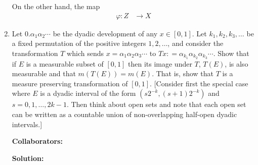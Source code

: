 \documentclass{article}%
\begin{document}
\begin{enumerate}
On the other hand, the map
$$
\begin{aligned}
\varphi: Z &\to X
\end{aligned}
$$
\bigskip


\item  Let $0.\alpha_1 \alpha_2 \cdots$ be the dyadic development of any $x\in[0,1]$. Let $k_1,k_2,k_3,\ldots$ be a fixed permutation of the positive integers $1,2,\ldots$, and consider the transformation $T$ which sends $x = \alpha_1\alpha_2\alpha_3\cdots$ to $Tx: = \alpha_{k_1}\alpha_{k_2}\alpha_{k_3}\cdots$. Show that if $E$ is a measurable subset of $[0,1]$ then its image under $T$, $T(E)$, is also measurable and that $m(T(E))= m(E)$.  That is, show that $T$ is a measure preserving transformation of $[0,1]$. [Consider first the special case where $E$ is a dyadic interval of the form $(s2^{-k}, (s+1)2^{-k})$ and $s = 0,1,\ldots, 2k-1$.  Then think about open sets and note that each open set can be written as a countable union of non-overlapping half-open dyadic intervals.]

\bigskip
\textbf{Collaborators:}\\
\smallskip
 
\textbf{Solution:}
\bigskip


\end{enumerate}
\end{document}
